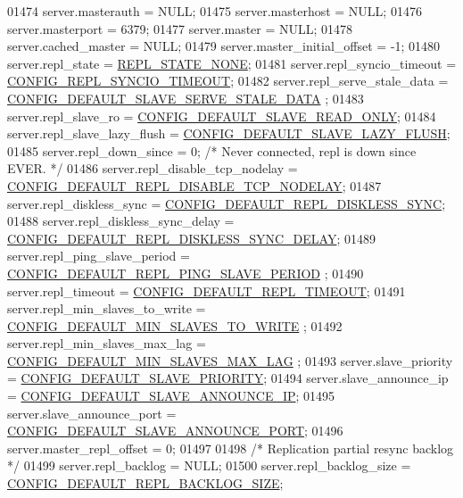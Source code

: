\begin{DoxyCode}
{{{{{{{{{{{{{{{01474     server.masterauth = NULL;
01475     server.masterhost = NULL;
01476     server.masterport = 6379;
01477     server.master = NULL;
01478     server.cached\_master = NULL;
01479     server.master\_initial\_offset = -1;
01480     server.repl\_state = \hyperlink{server_8h_a256b9506e551eaa7417f75f8fa9ed901}{REPL\_STATE\_NONE};
01481     server.repl\_syncio\_timeout = \hyperlink{server_8h_a68ad9c6e5f817d58fa51c1b2e88e83e0}{CONFIG\_REPL\_SYNCIO\_TIMEOUT};
01482     server.repl\_serve\_stale\_data = \hyperlink{server_8h_ab42b23884952f9887529b6efbf0d4ac6}{CONFIG\_DEFAULT\_SLAVE\_SERVE\_STALE\_DATA}
      ;
01483     server.repl\_slave\_ro = \hyperlink{server_8h_af9b93e225d47183c97bc1f86db1aff2a}{CONFIG\_DEFAULT\_SLAVE\_READ\_ONLY};
01484     server.repl\_slave\_lazy\_flush = \hyperlink{server_8h_ace54c14c3b13acbf1d7a6d6e893cdfd3}{CONFIG\_DEFAULT\_SLAVE\_LAZY\_FLUSH};
01485     server.repl\_down\_since = 0; \textcolor{comment}{/* Never connected, repl is down since EVER. */}
01486     server.repl\_disable\_tcp\_nodelay = 
      \hyperlink{server_8h_a27f51044a8a11ab99366a77bb3ea1e93}{CONFIG\_DEFAULT\_REPL\_DISABLE\_TCP\_NODELAY};
01487     server.repl\_diskless\_sync = \hyperlink{server_8h_a08ebaf972da18ad58c71c615aa26c5cf}{CONFIG\_DEFAULT\_REPL\_DISKLESS\_SYNC};
01488     server.repl\_diskless\_sync\_delay = 
      \hyperlink{server_8h_aee54cf0e2819c8b96136987f0f8ef0b8}{CONFIG\_DEFAULT\_REPL\_DISKLESS\_SYNC\_DELAY};
01489     server.repl\_ping\_slave\_period = \hyperlink{server_8h_a5496312872886690751d1e4a248026e9}{CONFIG\_DEFAULT\_REPL\_PING\_SLAVE\_PERIOD}
      ;
01490     server.repl\_timeout = \hyperlink{server_8h_a7608d2301c8447e2237ba173d8eef88e}{CONFIG\_DEFAULT\_REPL\_TIMEOUT};
01491     server.repl\_min\_slaves\_to\_write = \hyperlink{server_8h_a68661cd596afb7595059264beee63dc7}{CONFIG\_DEFAULT\_MIN\_SLAVES\_TO\_WRITE}
      ;
01492     server.repl\_min\_slaves\_max\_lag = \hyperlink{server_8h_a547664770d2cec2d58d144a2f5afbbd8}{CONFIG\_DEFAULT\_MIN\_SLAVES\_MAX\_LAG}
      ;
01493     server.slave\_priority = \hyperlink{server_8h_a7effaf912f26a1eabe495e899d705fee}{CONFIG\_DEFAULT\_SLAVE\_PRIORITY};
01494     server.slave\_announce\_ip = \hyperlink{server_8h_aca61db3dff4f6e864b3e49d3f087fb51}{CONFIG\_DEFAULT\_SLAVE\_ANNOUNCE\_IP};
01495     server.slave\_announce\_port = \hyperlink{server_8h_ac8ad217da6cfbdf399948aff4d3550ca}{CONFIG\_DEFAULT\_SLAVE\_ANNOUNCE\_PORT};
01496     server.master\_repl\_offset = 0;
01497 
01498     \textcolor{comment}{/* Replication partial resync backlog */}
01499     server.repl\_backlog = NULL;
01500     server.repl\_backlog\_size = \hyperlink{server_8h_a6ac2fd3dd83df43a6b262bab091bc371}{CONFIG\_DEFAULT\_REPL\_BACKLOG\_SIZE};
}}}}}}}}}}}}}}}
\end{DoxyCode}
